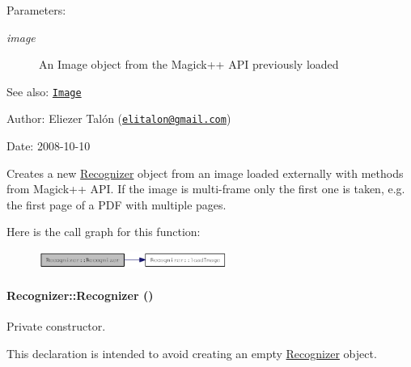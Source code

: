 \begin{Desc}
\item[Parameters:]
\begin{description}
\item[{\em image}]An Image object from the Magick++ API previously loaded\end{description}
\end{Desc}
\begin{Desc}
\item[See also:]\href{http://www.imagemagick.org/Magick++/Image.html}{\tt Image}\end{Desc}
\begin{Desc}
\item[Author:]Eliezer Talón (\href{mailto:elitalon@gmail.com}{\tt elitalon@gmail.com}) \end{Desc}
\begin{Desc}
\item[Date:]2008-10-10\end{Desc}
Creates a new \hyperlink{class_recognizer}{Recognizer} object from an image loaded externally with methods from Magick++ API. If the image is multi-frame only the first one is taken, e.g. the first page of a PDF with multiple pages. 

Here is the call graph for this function:\nopagebreak
\begin{figure}[H]
\begin{center}
\leavevmode
\includegraphics[width=175pt]{class_recognizer_01e0b85a6ad9cfbf6fcab4fe4b294640_cgraph}
\end{center}
\end{figure}
\hypertarget{class_recognizer_4bf77b760d8dbc50c4ef50cad433db40}{
\paragraph[{Recognizer}]{\setlength{\rightskip}{0pt plus 5cm}Recognizer::Recognizer ()}\hfill}
\label{class_recognizer_4bf77b760d8dbc50c4ef50cad433db40}


Private constructor. 

This declaration is intended to avoid creating an empty \hyperlink{class_recognizer}{Recognizer} object.

